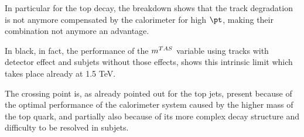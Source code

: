 
In particular for the top decay, the breakdown shows that the track degradation is not anymore compensated by the calorimeter for high $\pt$, making their combination not anymore an advantage.


In black, in fact, the performance of the $m^{TAS}$ variable using tracks with detector effect and subjets without those effects, shows this intrinsic limit which takes place already at 1.5 TeV.

The crossing point is, as already pointed out for the top jets, present because of the optimal performance of the calorimeter system caused by the higher mass of the top quark, and partially also because of its more complex decay structure and difficulty to be resolved in subjets.




% 


